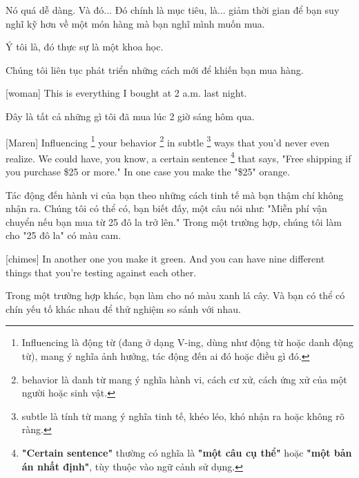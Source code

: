 \documentclass[a4paper]{article}
\begin{document}
	
	\begin{vietnamese-v2}
		
		Nó quá dễ dàng. Và đó... Đó chính là mục tiêu, là... giảm thời gian để bạn suy nghĩ kỹ hơn về một món hàng mà bạn nghĩ mình muốn mua. 
		
		Ý tôi là, đó thực sự là một khoa học. 
		
		Chúng tôi liên tục phát triển những cách mới để khiến bạn mua hàng.
	\end{vietnamese-v2}
	
	[woman] This is everything I bought at 2 a.m. last night.
	
	\begin{vietnamese-v2}
		 Đây là tất cả những gì tôi đã mua lúc 2 giờ sáng hôm qua.
	\end{vietnamese-v2}
	
	[Maren] Influencing \footnote{
		Influencing là động từ (đang ở dạng V-ing, dùng như động từ hoặc danh động từ), mang ý nghĩa ảnh hưởng, tác động đến ai đó hoặc điều gì đó.
	
	} your behavior \footnote{
		behavior là danh từ mang ý nghĩa hành vi, cách cư xử, cách ứng xử của một người hoặc sinh vật.
	
	} in subtle \footnote{
		subtle là tính từ mang ý nghĩa tinh tế, khéo léo, khó nhận ra hoặc không rõ ràng.
	
	} ways that you'd never even realize. We could have, you know, a certain sentence \footnote{
		\textbf{"Certain sentence"} thường có nghĩa là \textbf{"một câu cụ thể"} hoặc \textbf{"một bản án nhất định"}, tùy thuộc vào ngữ cảnh sử dụng. 
	
	} that says, "Free shipping if you purchase \$25 or more." In one case you make the "\$25" orange.

	\begin{vietnamese-v2}
		[Maren] Tác động đến hành vi của bạn theo những cách tinh tế mà bạn thậm chí không nhận ra. Chúng tôi có thể có, bạn biết đấy, một câu nói như: "Miễn phí vận chuyển nếu bạn mua từ 25 đô la trở lên." Trong một trường hợp, chúng tôi làm cho "25 đô la" có màu cam.
	\end{vietnamese-v2}

	[chimes]
	In another one you make it green. And you can have nine different things that you're testing against each other.
	
	\begin{vietnamese-v2}
		Trong một trường hợp khác, bạn làm cho nó màu xanh lá cây. Và bạn có thể có chín yếu tố khác nhau để thử nghiệm so sánh với nhau.
	\end{vietnamese-v2}
	
\end{document}
